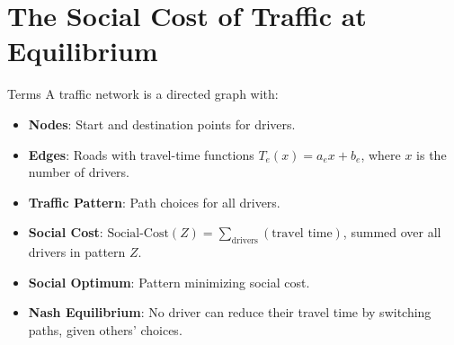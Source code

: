 \documentclass[10pt]{beamer}
\begin{document}
\section{The Social Cost of Traffic at Equilibrium}

\begin{frame}{Terms}
A traffic network is a directed graph with:
\onslide<+->
\begin{itemize}[<+->]
    \item \textbf{Nodes}: Start and destination points for drivers.
    \item \textbf{Edges}: Roads with travel-time functions \( T_e(x) = a_e x + b_e \), where \( x \) is the number of drivers.
    \item \textbf{Traffic Pattern}: Path choices for all drivers.
    \item \textbf{Social Cost}: \( \text{Social-Cost}(Z) = \sum_{\text{drivers}} (\text{travel time}) \), summed over all drivers in pattern \( Z \).
    \item \textbf{Social Optimum}: Pattern minimizing social cost.
    \item \textbf{Nash Equilibrium}: No driver can reduce their travel time by switching paths, given others' choices.
\end{itemize}
\end{frame}
\end{document}
